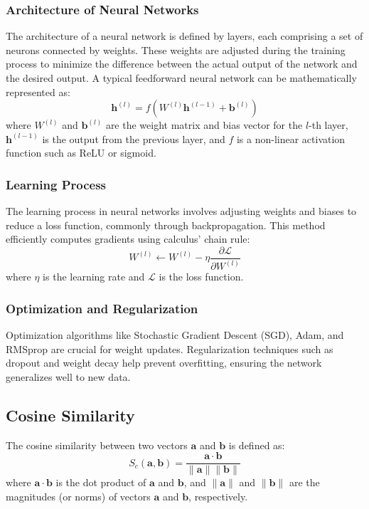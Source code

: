     \subsubsection{Architecture of Neural Networks}
    The architecture of a neural network is defined by layers, each comprising a set of neurons connected by weights. These weights are adjusted during the training process to minimize the difference between the actual output of the network and the desired output. A typical feedforward neural network can be mathematically represented as:
    \begin{equation}
        \mathbf{h}^{(l)} = f(W^{(l)}\mathbf{h}^{(l-1)} + \mathbf{b}^{(l)})
    \end{equation}
    where $W^{(l)}$ and $\mathbf{b}^{(l)}$ are the weight matrix and bias vector for the $l$-th layer, $\mathbf{h}^{(l-1)}$ is the output from the previous layer, and $f$ is a non-linear activation function such as ReLU or sigmoid.
    
    \subsubsection{Learning Process}
    The learning process in neural networks involves adjusting weights and biases to reduce a loss function, commonly through backpropagation. This method efficiently computes gradients using calculus' chain rule:
    \begin{equation}
        W^{(l)} \leftarrow W^{(l)} - \eta \frac{\partial \mathcal{L}}{\partial W^{(l)}}
    \end{equation}
    where $\eta$ is the learning rate and $\mathcal{L}$ is the loss function.
    
    \subsubsection{Optimization and Regularization}
    Optimization algorithms like Stochastic Gradient Descent (SGD), Adam, and RMSprop are crucial for weight updates. Regularization techniques such as dropout and weight decay help prevent overfitting, ensuring the network generalizes well to new data.
    
\subsection{Cosine Similarity}
The cosine similarity between two vectors $\mathbf{a}$ and $\mathbf{b}$ is defined as:
\[
S_c(\mathbf{a}, \mathbf{b}) = \frac{\mathbf{a} \cdot \mathbf{b}}{\|\mathbf{a}\| \|\mathbf{b}\|}
\]
where $\mathbf{a} \cdot \mathbf{b}$ is the dot product of $\mathbf{a}$ and $\mathbf{b}$, and $\|\mathbf{a}\|$ and $\|\mathbf{b}\|$ are the magnitudes (or norms) of vectors $\mathbf{a}$ and $\mathbf{b}$, respectively.

